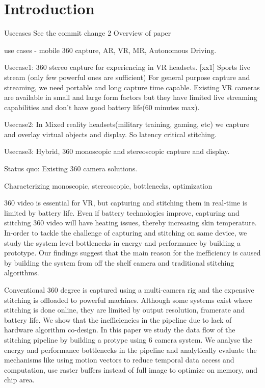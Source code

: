 \chapter{Introduction}
Usecases \newline
See the commit change 2
Overview of paper \newline

use cases - mobile 360 capture, AR, VR, MR, Autonomous Driving. \newline

Usecase1: 360 stereo capture for experiencing in VR headsets. 
[xx1] Sports live stream (only few powerful ones are sufficient)
For general purpose capture and streaming, we need portable and long capture time capable. Existing VR cameras are available in small and large form factors but they have limited live streaming capabilities and don't have good battery life(60 minutes max). 

Usecase2: In Mixed reality headsets(military training, gaming, etc) we capture and overlay virtual objects and display. So latency critical stitching. 

Usecase3: Hybrid, 360 monoscopic and stereoscopic capture and display.

Status quo:
Existing 360 camera solutions. \newline



Characterizing monoscopic, stereoscopic, bottlenecks, optimization


360 video is essential for VR, but capturing and stitching them in real-time is limited by battery life. Even if battery technologies improve, capturing and stitching 360 video will have heating issues, thereby increasing skin temperature. In-order to tackle the challenge of capturing and stitching on same device, we study the system level bottlenecks in energy and performance by building a prototype. Our findings suggest that the main reason for the inefficiency is caused by building the system from off the shelf camera and traditional stitching algorithms. 

Conventional 360 degree is captured using a multi-camera rig and the expensive stitching is offloaded to powerful machines. Although some systems exist where stitching is done online, they are limited by output resolution, framerate and battery life. We show that the inefficiencies in the pipeline due to lack of hardware algorithm co-design. In this paper we study the data flow of the stitching pipeline by building a protype using 6 camera system. We analyse the energy and performance bottlenecks in the pipeline and analytically evaluate the mechanisms like using motion vectors to reduce temporal data access and computation, use raster buffers instead of full image to optimize on memory, and chip area. 


